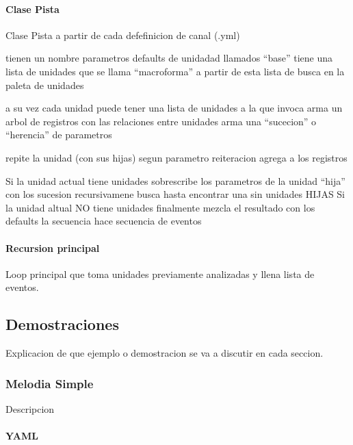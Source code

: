 \documentclass[]{article}
\let\oldparagraph\paragraph
\renewcommand{\paragraph}[1]{\oldparagraph{#1}\mbox{}}
\begin{document}
\hypertarget{clase-pista}{%
\paragraph{Clase Pista}\label{clase-pista}}

Clase Pista a partir de cada defefinicion de canal (.yml)

tienen un nombre parametros defaults de unidadad llamados ``base'' tiene
una lista de unidades que se llama ``macroforma'' a partir de esta lista
de busca en la paleta de unidades

a su vez cada unidad puede tener una lista de unidades a la que invoca
arma un arbol de registros con las relaciones entre unidades arma una
``sucecion'' o ``herencia'' de parametros

repite la unidad (con sus hijas) segun parametro reiteracion agrega a
los registros

Si la unidad actual tiene unidades sobrescribe los parametros de la
unidad ``hija'' con los sucesion recursivamene busca hasta encontrar una
sin unidades HIJAS Si la unidad altual NO tiene unidades finalmente
mezcla el resultado con los defaults la secuencia hace secuencia de
eventos

\newpage

\hypertarget{recursion-principal}{%
\paragraph{Recursion principal}\label{recursion-principal}}

Loop principal que toma unidades previamente analizadas y llena lista de
eventos.

\hypertarget{demostraciones}{%
\subsection{Demostraciones}\label{demostraciones}}

Explicacion de que ejemplo o demostracion se va a discutir en cada
seccion.

\hypertarget{melodia-simple}{%
\subsubsection{Melodia Simple}\label{melodia-simple}}

Descripcion

\hypertarget{yaml-1}{%
\paragraph{YAML}\label{yaml-1}}
\end{document}
